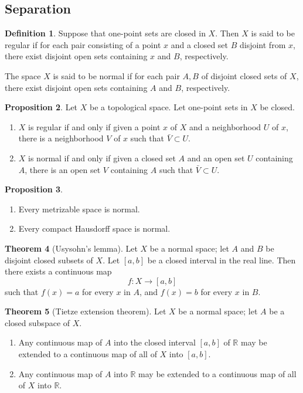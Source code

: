 \documentclass[12pt,a4paper]{book}
\newenvironment{enu}{\begin{enumerate}[(1)]}{\end{enumerate}}
\theoremstyle{definition}
\newtheorem{defn}{Definition}[section]
\newtheorem{theo}[defn]{Theorem}
\newtheorem{prop}[defn]{Proposition}
\begin{document}
\subsection{Separation}
\begin{defn}
    Suppose that one-point sets are closed in $X$. Then $X$ is said to be regular if for each pair consisting of a point $x$ and a closed set $B$ disjoint from $x$, there exist disjoint open sets containing $x$ and $B$, respectively.

    The space $X$ is said to be normal if for each pair $A, B$ of disjoint closed sets of $X$, there exist disjoint open sets containing $A$ and $B$, respectively.
\end{defn}
\begin{prop}
    Let $X$ be a topological space. Let one-point sets in $X$ be closed.
    \begin{enu}
        \item $X$ is regular if and only if given a point $x$ of $X$ and a neighborhood $U$ of $x$, there is a neighborhood $V$ of $x$ such that $\bar{V} \subset U$.
        \item $X$ is normal if and only if given a closed set $A$ and an open set $U$ containing $A$, there is an open set $V$ containing $A$ such that $\bar{V} \subset U$.
    \end{enu}
\end{prop}
\begin{prop}
    \begin{enu}
        \item Every metrizable space is normal.

        \item Every compact Hausdorff space is normal.
    \end{enu}
\end{prop}
\begin{theo}[Usysohn's lemma]
    Let $X$ be a normal space; let $A$ and $B$ be disjoint closed subsets of $X$. Let $[a, b]$ be a closed interval in the real line. Then there exists a continuous map
    $$
        f: X \longrightarrow[a, b]
    $$
    such that $f(x)=a$ for every $x$ in $A$, and $f(x)=b$ for every $x$ in $B$.
\end{theo}
\begin{theo}[Tietze extension theorem]
    Let $X$ be a normal space; let $A$ be a closed subspace of $X$.
    \begin{enu}
        \item Any continuous map of $A$ into the closed interval $[a, b]$ of $\mathbb{R}$ may be extended to a continuous map of all of $X$ into $[a, b]$.
        \item Any continuous map of $A$ into $\mathbb{R}$ may be extended to a continuous map of all of $X$ into $\mathbb{R}$.
    \end{enu}
\end{theo}
\end{document}
